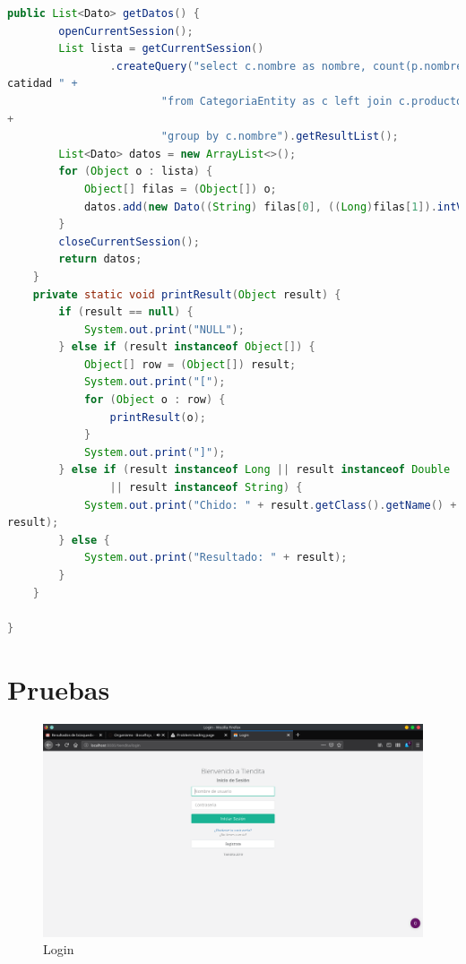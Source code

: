 \documentclass[a4paper,12pt]{article}
\begin{document}
\begin{lstlisting}[language=Java, style=customJava, 
caption={ProductoDaoImpl.java}, captionpos=b,basicstyle=\fontfamily{cmss}\small]
    public List<Dato> getDatos() {
        openCurrentSession();
        List lista = getCurrentSession()
                .createQuery("select c.nombre as nombre, count(p.nombre) as 
catidad " +
                        "from CategoriaEntity as c left join c.productos as p " 
+
                        "group by c.nombre").getResultList();
        List<Dato> datos = new ArrayList<>();
        for (Object o : lista) {
            Object[] filas = (Object[]) o;
            datos.add(new Dato((String) filas[0], ((Long)filas[1]).intValue()));
        }
        closeCurrentSession();
        return datos;
    }
    private static void printResult(Object result) {
        if (result == null) {
            System.out.print("NULL");
        } else if (result instanceof Object[]) {
            Object[] row = (Object[]) result;
            System.out.print("[");
            for (Object o : row) {
                printResult(o);
            }
            System.out.print("]");
        } else if (result instanceof Long || result instanceof Double
                || result instanceof String) {
            System.out.print("Chido: " + result.getClass().getName() + ": " + 
result);
        } else {
            System.out.print("Resultado: " + result);
        }
    }

}
\end{lstlisting}

\section{Pruebas}

\begin{figure}[H]
\begin{center}
 \includegraphics[width=\textwidth]{login.png}
 \caption{Login}
 \label{fig:login}
\end{center}
\end{figure}
\end{document}
